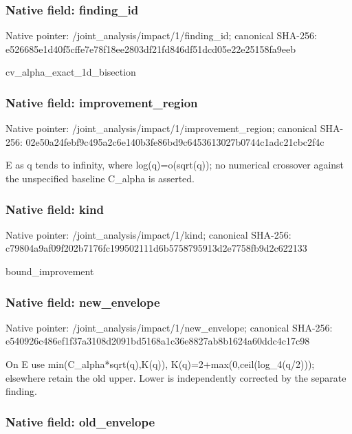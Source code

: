 \documentclass[10pt,a4paper]{article}
\begin{document}
\subsubsection{Native field: finding\_id}


Native pointer: /joint\_analysis/impact/1/finding\_id; canonical SHA-256: e526685e1d40f5cffe7e78f1\allowbreak{}8ee2803df21fd846df51dcd0\allowbreak{}5e22e25158fa9eeb


cv\_alpha\_exact\_1d\_bisection


\subsubsection{Native field: improvement\_region}


Native pointer: /joint\_analysis/impact/1\allowbreak{}/improvement\_region; canonical SHA-256: 02e50a24febf9c495a2c6e14\allowbreak{}0b3fe86bd9c6453613027b07\allowbreak{}44c1adc21cbc2f4c


E as q tends to infinity, where log(q)=o(sqrt(q)); no numerical crossover against the unspecified baseline C\_alpha is asserted.


\subsubsection{Native field: kind}


Native pointer: /joint\_analysis/impact/1/kind; canonical SHA-256: c79804a9af09f202b7176fc1\allowbreak{}99502111d6b5758795913d2e\allowbreak{}7758fb9d2c622133


bound\_improvement


\subsubsection{Native field: new\_envelope}


Native pointer: /joint\_analysis/impact/1/new\_envelope; canonical SHA-256: e540926c486ef1f37a3108d2\allowbreak{}091bd5168a1c36e8827ab8b1\allowbreak{}624a60ddc4c17c98


On E use min(C\_alpha*sqrt(q),K(q)), K(q)=2+max(0,ceil(log\_4(q/2))); elsewhere retain the old upper. Lower is independently corrected by the separate finding.


\subsubsection{Native field: old\_envelope}
\end{document}
